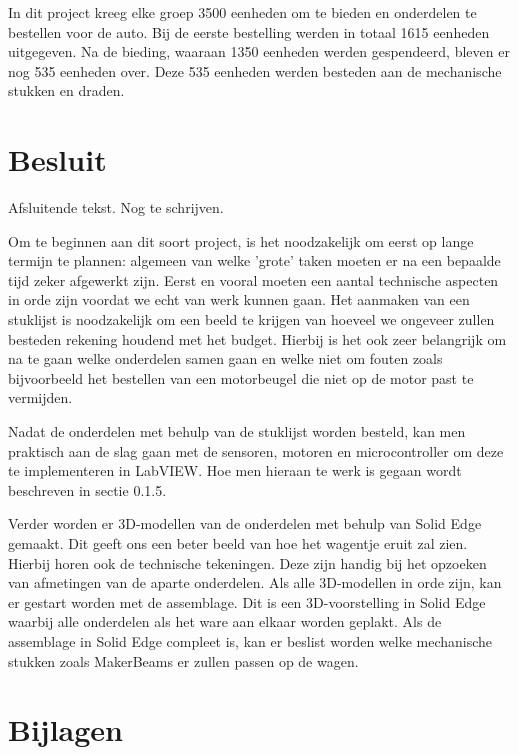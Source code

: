 \documentclass[a4paper,twoside,kulak]{kulakreport} %
\begin{document}
In dit project kreeg elke groep 3500 eenheden om te bieden en onderdelen te bestellen voor de auto. Bij de eerste bestelling werden in totaal 1615 eenheden uitgegeven. Na de bieding, waaraan 1350 eenheden werden gespendeerd, bleven er nog 535 eenheden over. Deze 535 eenheden werden besteden aan de mechanische stukken en draden.



\section{Besluit}

Afsluitende tekst. Nog te schrijven.




Om te beginnen aan dit soort project, is het noodzakelijk om eerst op lange termijn te plannen: algemeen van welke 'grote' taken moeten er na een bepaalde tijd zeker afgewerkt zijn. Eerst en vooral moeten een aantal technische aspecten in orde zijn voordat we echt van werk kunnen gaan. Het aanmaken van een stuklijst is noodzakelijk om een beeld te krijgen van hoeveel we ongeveer zullen besteden rekening houdend met het budget. Hierbij is het ook zeer belangrijk om na te gaan welke onderdelen samen gaan en welke niet om fouten zoals bijvoorbeeld het bestellen van een motorbeugel die niet op de motor past te vermijden.

Nadat de onderdelen met behulp van de stuklijst worden besteld, kan men praktisch aan de slag gaan met de sensoren, motoren en microcontroller om deze te implementeren in LabVIEW. Hoe men hieraan te werk is gegaan wordt beschreven in sectie 0.1.5.

Verder worden er 3D-modellen van de onderdelen met behulp van Solid Edge gemaakt. Dit geeft ons een beter beeld van hoe het wagentje eruit zal zien. Hierbij horen ook de technische tekeningen. Deze zijn handig bij het opzoeken van afmetingen van de aparte onderdelen. Als alle 3D-modellen in orde zijn, kan er gestart worden met de assemblage. Dit is een 3D-voorstelling in Solid Edge waarbij alle onderdelen als het ware aan elkaar worden geplakt. Als de assemblage in Solid Edge compleet is, kan er beslist worden welke mechanische stukken zoals MakerBeams er zullen passen op de wagen.
\label{Planning}



\newpage

\section{Bijlagen}
\label{financieel rapport}






\end{document}

